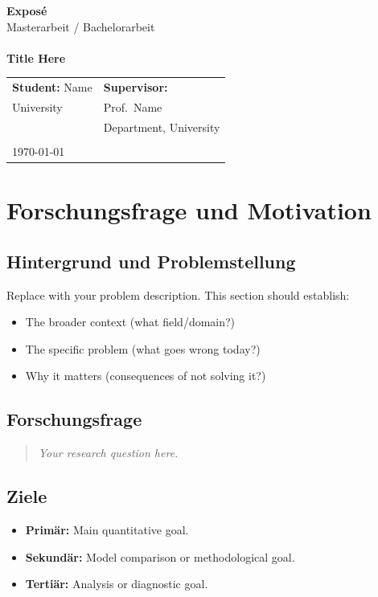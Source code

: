 \documentclass[11pt, a4paper, oneside]{article}
\begin{document}
\pagestyle{empty}

\vspace*{-2cm}
\begin{center}
{\huge\textbf{Exposé}}\\[2mm]
{Masterarbeit / Bachelorarbeit}\\\\[4mm]
\textbf{\Large Title Here}

\vspace{4mm}
\begin{tabular}{@{}p{}p{}@{}}
\textbf{Student:} Name & \textbf{Supervisor:} \\
University & Prof.\ Name \\
& Department, University \\
& \\
\today & \\
\end{tabular}
\end{center}

\newpage

\section{Forschungsfrage und Motivation}

\subsection{Hintergrund und Problemstellung}
Replace with your problem description. This section should establish:
\begin{itemize}
    \item The broader context (what field/domain?)
    \item The specific problem (what goes wrong today?)
    \item Why it matters (consequences of not solving it?)
\end{itemize}

\subsection{Forschungsfrage}
\begin{quote}
\textit{Your research question here.}
\end{quote}

\subsection{Ziele}
\begin{itemize}
    \item \textbf{Primär:} Main quantitative goal.
    \item \textbf{Sekundär:} Model comparison or methodological goal.
    \item \textbf{Tertiär:} Analysis or diagnostic goal.
\end{itemize}
\end{document}
